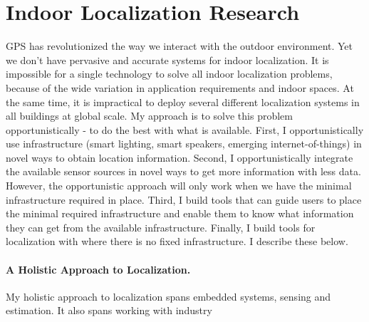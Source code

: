 \documentclass[10pt]{article}
\begin{document}
\section{Indoor Localization Research}

GPS has revolutionized the way we interact with the outdoor environment.  %
Yet we don't have pervasive and accurate systems for indoor localization.  
It is impossible for a single technology to solve all indoor localization problems, because of the wide variation in application requirements and indoor spaces.  At the same time, it is impractical to deploy several different localization systems in all buildings at global scale. %
My approach is to solve this problem opportunistically - to do the best with what is available. %
First, I opportunistically use infrastructure (smart lighting, smart speakers, emerging internet-of-things) in novel ways to obtain location information. Second, I opportunistically integrate the available sensor sources in novel ways to get more information with less data. \\
However, the opportunistic approach will only work when we have the minimal infrastructure required in place. Third, I build tools that can guide users to place the minimal required infrastructure and enable them to know what information they can get from the available infrastructure. Finally, I build tools for localization with where there is no fixed infrastructure. I describe these below. 

\paragraph{A Holistic Approach to Localization. } My holistic approach to localization spans embedded systems, sensing and estimation. It also spans working with industry 
\end{document}
